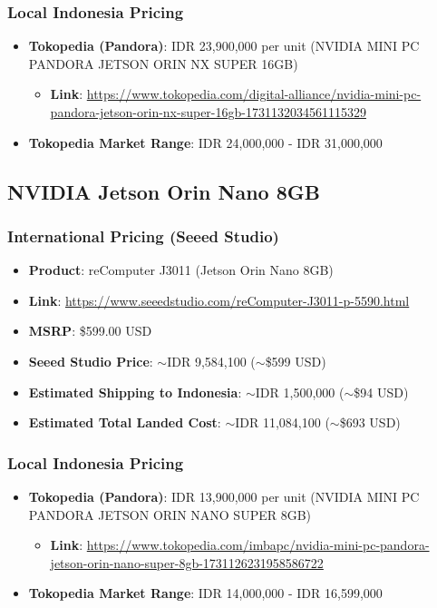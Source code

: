 \documentclass[12pt,a4paper]{article}
\begin{document}
\subsubsection*{Local Indonesia Pricing}
\begin{itemize}
    \item \textbf{Tokopedia (Pandora)}: IDR 23,900,000 per unit (NVIDIA MINI PC PANDORA JETSON ORIN NX SUPER 16GB)
    \begin{itemize}
        \item \textbf{Link}: \url{https://www.tokopedia.com/digital-alliance/nvidia-mini-pc-pandora-jetson-orin-nx-super-16gb-1731132034561115329}
    \end{itemize}
    \item \textbf{Tokopedia Market Range}: IDR 24,000,000 - IDR 31,000,000
\end{itemize}

\subsection{NVIDIA Jetson Orin Nano 8GB}

\subsubsection*{International Pricing (Seeed Studio)}
\begin{itemize}
    \item \textbf{Product}: reComputer J3011 (Jetson Orin Nano 8GB)
    \item \textbf{Link}: \url{https://www.seeedstudio.com/reComputer-J3011-p-5590.html}
    \item \textbf{MSRP}: \$599.00 USD
    \item \textbf{Seeed Studio Price}: $\sim$IDR 9,584,100 ($\sim$\$599 USD)
    \item \textbf{Estimated Shipping to Indonesia}: $\sim$IDR 1,500,000 ($\sim$\$94 USD)
    \item \textbf{Estimated Total Landed Cost}: $\sim$IDR 11,084,100 ($\sim$\$693 USD)
\end{itemize}

\subsubsection*{Local Indonesia Pricing}
\begin{itemize}
    \item \textbf{Tokopedia (Pandora)}: IDR 13,900,000 per unit (NVIDIA MINI PC PANDORA JETSON ORIN NANO SUPER 8GB)
    \begin{itemize}
        \item \textbf{Link}: \url{https://www.tokopedia.com/imbapc/nvidia-mini-pc-pandora-jetson-orin-nano-super-8gb-1731126231958586722}
    \end{itemize}
    \item \textbf{Tokopedia Market Range}: IDR 14,000,000 - IDR 16,599,000
\end{itemize}
\end{document}
